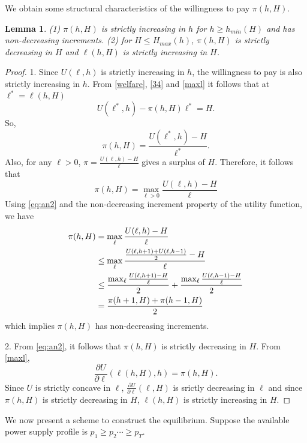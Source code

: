 \documentclass[10pt,draftcls,onecolumn]{IEEEtran}
\newtheorem{lemma}{Lemma}
\newcounter{l1}
\newcounter{l2}
\newcounter{l3}
\renewcommand{\hm}{h_{min}}
\begin{document}
We obtain some structural characteristics of the willingness to pay $\pi(h,H)$.




\begin{lemma} \label{L2}
(1) $\pi(h,H)$ is  strictly increasing in $h$ for $h \ge \hm (H)$ and has non-decreasing increments. (2)  for $H \leq H_{max}(h)$, $\pi(h,H)$ is strictly decreasing in $H$ and  $\ell(h,H)$ is strictly increasing in $H$.
 \end{lemma}
\begin{proof}  1. Since $U(\ell,h)$ is strictly increasing in $h$, the willingness to pay is also strictly increasing in $h$.  From \eqref{welfare}, \eqref{34} and \eqref{maxl} it follows that at $\ell^* = \ell(h,H)$
\begin{equation}
U(\ell^*,h) - \pi(h,H)\ell^* = H.
\end{equation}
So,
\begin{equation}\label{eq:an1}
\pi(h,H) = \frac{U(\ell^*,h) -H}{\ell^*}.
\end{equation}
Also, for any $\ell >0$, $\pi =  \frac{U(\ell,h) -H}{\ell}$ gives a surplus of $H$. Therefore, it follows that 
\begin{equation}\label{eq:an2}
\pi(h,H)  =  \max_{\ell>0} \frac{U(\ell,h)-H}{\ell}
\end{equation}
Using \eqref{eq:an2} and the non-decreasing increment property of the utility function, we have
\begin{align}
\pi(h,H) & =  \max_{\ell} \frac{U(\ell,h)-H}{\ell} \notag \\
 &\leq  \max_{\ell} \frac{\frac{U(\ell,h+1)+U(\ell,h-1)}{2}-H}{\ell} \notag \\
 &\leq \frac{\max_{\ell} \frac{U(\ell,h+1)-H}{\ell}}{2} + \frac{\max_{\ell} \frac{U(\ell,h-1)-H}{\ell}}{2} \notag \\
 &= \frac{\pi(h+1,H) + \pi(h-1,H)}{2}
\end{align}
which implies $\pi(h,H)$ has non-decreasing increments.  

2. From \eqref{eq:an2}, it follows that $\pi(h,H)$ is strictly decreasing in $H$. From \eqref{maxl},
\[\frac{\partial  U}{ \partial \ell} (\ell (h,H), h) = \pi (h, H).\]
Since $U$ is strictly concave in $\ell$, $\frac{\partial  U}{ \partial \ell} (\ell , H)$ is srictly decreasing in $\ell$ and since $\pi (h,H)$ is strictly
decreasing in $H$, $\ell(h,H)$ is strictly increasing in $H$.
\end{proof}

We now present a scheme to construct the equilibrium.  Suppose the available power supply profile is $p_1 \ge p_2 \cdots \ge p_T$.
\end{document}
